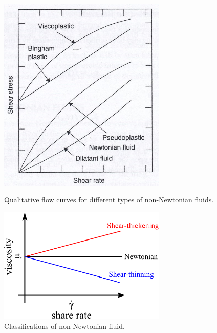 \begin{center}
    \begin{figure}[h]
        \centering
        \includegraphics[width=8.0cm,clip]{1-Background/1-fluid-curve.jpg}
        \caption{Qualitative flow curves for different types of non-Newtonian fluids\cite{ref:1}.}
        \label{fig:1-fluid-curve}
        \centering
        \includegraphics[width=8.0cm,clip]{1-Background/2-Newton-fluid.png}
        \caption{Classifications of non-Newtonian fluid.}
        \label{fig:2-Newton-fluid}
    \end{figure}

    \newpage


\end{center}
